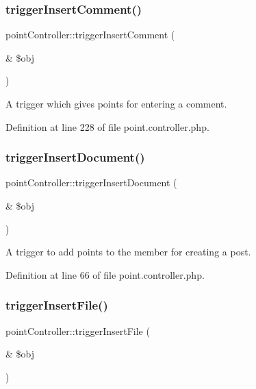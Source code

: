 \subsubsection{\texorpdfstring{trigger\+Insert\+Comment()}{triggerInsertComment()}}
{\footnotesize\ttfamily point\+Controller\+::trigger\+Insert\+Comment (\begin{DoxyParamCaption}\item[{\&}]{\$obj }\end{DoxyParamCaption})}



A trigger which gives points for entering a comment. 



Definition at line 228 of file point.\+controller.\+php.

\mbox{\label{classpointController_aba87f873c4b2d31e70a9b326e1e6e753}} 
\subsubsection{\texorpdfstring{trigger\+Insert\+Document()}{triggerInsertDocument()}}
{\footnotesize\ttfamily point\+Controller\+::trigger\+Insert\+Document (\begin{DoxyParamCaption}\item[{\&}]{\$obj }\end{DoxyParamCaption})}



A trigger to add points to the member for creating a post. 



Definition at line 66 of file point.\+controller.\+php.

\mbox{\label{classpointController_a48e790691506d5c5a6feac45e7237e3d}} 
\subsubsection{\texorpdfstring{trigger\+Insert\+File()}{triggerInsertFile()}}
{\footnotesize\ttfamily point\+Controller\+::trigger\+Insert\+File (\begin{DoxyParamCaption}\item[{\&}]{\$obj }\end{DoxyParamCaption})}




